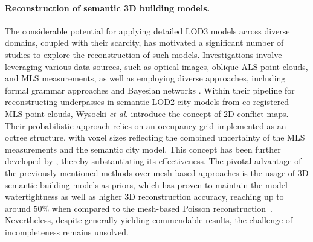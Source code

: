 \paragraph{Reconstruction of semantic 3D building models.}
The considerable potential for applying detailed \gls{LOD}3 models across diverse domains, coupled with their scarcity, has motivated a significant number of studies to explore the reconstruction of such models.
Investigations involve leveraging various data sources, such as optical images, oblique \gls{ALS} point clouds, and \gls{MLS} measurements, as well as employing diverse approaches, including formal grammar approaches and Bayesian networks \cite{ripperda_rekonstruktion_2010,helmutMayerLoD3,wysocki2023scan2lod3}.
Within their pipeline for reconstructing underpasses in semantic \gls{LOD}2 city models from co-registered \gls{MLS} point clouds, Wysocki \textit{et al.} introduce the concept of 2D conflict maps. 
Their probabilistic approach relies on an occupancy grid implemented as an octree structure, with voxel sizes reflecting the combined uncertainty of the \gls{MLS} measurements and the semantic city model.
This concept has been further developed by \cite{Wysocki_Conflict_Map,wysocki2023scan2lod3,hoegner2022automatic}, thereby substantiating its effectiveness.
The pivotal advantage of the previously mentioned methods over mesh-based approaches is the usage of 3D semantic building models as priors, which has proven to maintain the model watertightness as well as higher 3D reconstruction accuracy, reaching up to around $50\%$ when compared to the mesh-based Poisson reconstruction~\cite{wysocki2023scan2lod3}. 
Nevertheless, despite generally yielding commendable results, the challenge of incompleteness remains unsolved.


